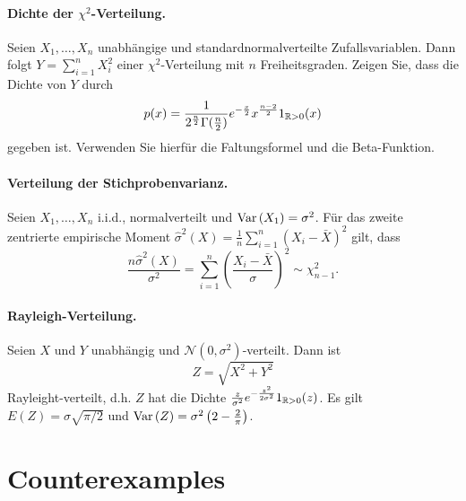 \paragraph{Dichte der $\chi^2$-Verteilung. }   Seien $X_1,\ldots,X_n$ unabhängige und
standardnormalverteilte Zufallsvariablen. Dann folgt $Y= \sum_{i=1}^{n} X_i^2$ einer
$\chi^2$-Verteilung mit $n$ Freiheitsgraden. Zeigen Sie, dass die Dichte von $Y$ durch
\begin{equation*}
    p(x) = \frac{1}{ 2^{\frac{n}{2}} \Gamma(\frac{n}{2})}e^{-\frac{x}{2}} x^{\frac{n-2}{2}} 1_{\mathbb R>0}(x)
\end{equation*}
gegeben ist. Verwenden Sie hierfür die Faltungsformel und die Beta-Funktion.

\paragraph{Verteilung der Stichprobenvarianz. }
Seien $X_1, \ldots, X_n$ i.i.d., normalverteilt und $\operatorname{Var}\left( X_1 \right)=\sigma^2$.
Für das zweite zentrierte empirische  Moment 
$\hat \sigma^2 \left( X \right)= \frac{1}{n} \sum_{i=1}^{n} \left( X_i - \bar X \right)^2 $
gilt, dass
\begin{equation*}
    \frac{n \hat \sigma^2 \left( X \right)}{\sigma^2 } = 
        \sum_{i=1}^{n} \left( \frac{X_i - \bar X}{ \sigma} \right)^2 \sim \chi^2_{n-1}.
\end{equation*}


\paragraph{Rayleigh-Verteilung. }  Seien $X$ und $Y$ unabhängig und 
$\mathcal N (0, \sigma^2)$-verteilt. Dann ist
\begin{equation*}
    Z= \sqrt{X^2 + Y^2} 
\end{equation*}
Rayleight-verteilt, d.h. 
$Z$ hat die Dichte $\frac{z}{\sigma^2}e^{-\frac{z^2}{2\sigma^2}}1_{\mathbb R>0}(z)$.
Es gilt $E\left( Z \right) = \sigma \sqrt{\pi/2}$ und 
$\operatorname{Var}\left( Z \right) = \sigma^2 \left( 2 - \frac{2}{\pi} \right)$.


\section{Counterexamples}

